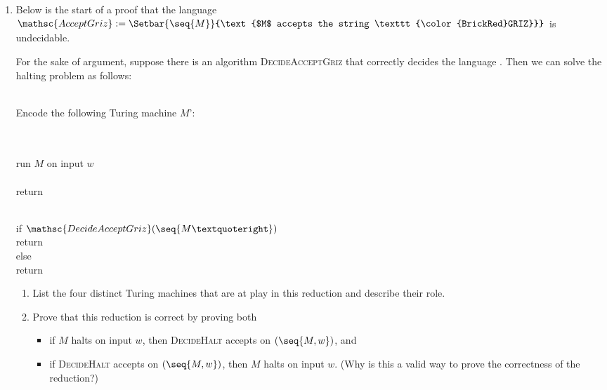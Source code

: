 \documentclass[11pt]{article}
\def\Sym#1{\texttt{\color{BrickRed}#1}}
\begin{document}
\begin{enumerate}
    \item Below is the start of a proof that the language
$\mathsc{AcceptGriz} := \Setbar{\seq{M}\strut}{\text{$M$ accepts the string \Sym{GRIZ}}}$ is undecidable.

\begin{Solution}
For the sake of argument, suppose there is an algorithm \textsc{Decide\-Accept\-Griz} that correctly decides the language .  Then we can solve the halting problem as follows:
\begin{algo}
	\+
\\	Encode the following Turing machine $M’$:\+\+\+
\\	\qquad\color{OliveGreen}
	\begin{algorithm}
		\+
	\\		
	\\		run $M$ on input $w$
	\\		
	\\		return 
	\end{algorithm}
\\[1ex]
	if $\mathsc{DecideAcceptGriz}(\seq{M’})$\+
\\		return \-
\\	else\+
\\		return 
\end{algo}

\end{Solution}

\begin{enumerate}
\item List the four distinct Turing machines that are at play in this reduction and describe their role.

        
\item Prove that this reduction is correct by proving both 
    \begin{itemize}
        \item if $M$ halts on input $w$, then \textsc{DecideHalt} accepts on $(\seq{M, w})$, and
        \item if \textsc{DecideHalt} accepts on $(\seq{M, w})$, then $M$ halts
        on input $w$. (Why is this a valid way to prove the correctness of the
        reduction?)
    \end{itemize}

\end{enumerate}


\end{enumerate}
\end{document}
